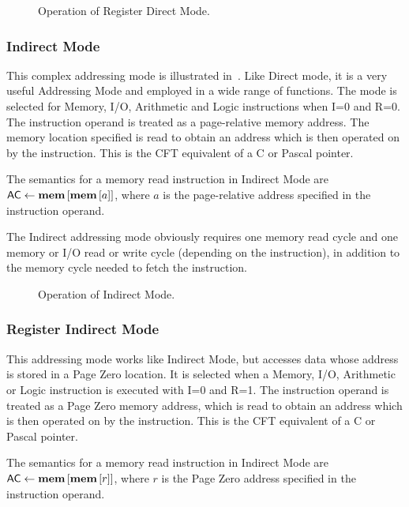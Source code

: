 \begin{figure}[htb]
 \centering
 \caption[Register Direct Mode]{\label{fig:register-direct-mode} Operation
   of Register Direct Mode.}
\end{figure}


\subsubsection{Indirect Mode}
\label{sec:indirect-mode}

This complex addressing mode is illustrated in~. Like
Direct mode, it is a very useful \gls{Addressing Mode} and employed in a wide
range of functions. The mode is selected for Memory, I/O, Arithmetic and Logic
instructions when I=0 and R=0. The instruction operand is treated as a
page-relative memory address. The memory location specified is read to obtain
an address which is then operated on by the instruction. This is the CFT
equivalent of a C or Pascal pointer.

The semantics for a memory read instruction in Indirect Mode are
$\mbox{\AC}\eq\memmem{a}$, where $a$ is the page-relative address specified in
the instruction operand.

The Indirect addressing mode obviously requires one memory read cycle and one memory or
I/O read or write cycle (depending on the instruction), in addition to the
memory cycle needed to fetch the instruction.


\begin{figure}[htb]
 \centering
 \caption[Indirect Mode]{\label{fig:indirect-mode} Operation
   of Indirect Mode.}
\end{figure}

\subsubsection{Register Indirect Mode}
\label{sec:register-indirect-mode}

This addressing mode works like Indirect Mode, but accesses data whose address
is stored in a Page Zero location. It is selected when a Memory, I/O,
Arithmetic or Logic instruction is executed with I=0 and R=1. The instruction
operand is treated as a Page Zero memory address, which is read to obtain an
address which is then operated on by the instruction. This is the CFT
equivalent of a C or Pascal pointer.

The semantics for a memory read instruction in Indirect Mode are
$\mbox{\AC}\eq\memmem{r}$, where $r$ is the Page Zero address specified in the
instruction operand.

